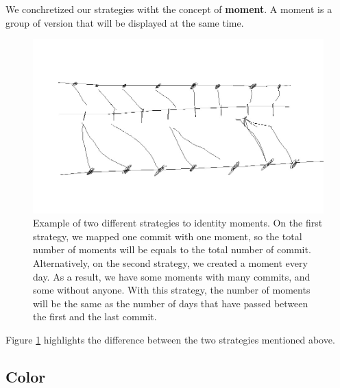 We conchretized our strategies witht the concept of \textbf{moment}. A moment is a group of version that will be displayed at the same time. 


\begin{figure}[H]
    \begin{center}
        \includegraphics[width=0.9\linewidth]{Moments.jpg} 
        \caption{Example of two different strategies to identity moments. 
        On the first strategy, we mapped one commit with one moment, so the total number of moments will be equals to the total number of commit.  
        Alternatively, on the second strategy, we created a moment every day.
        As a result, we have some moments with many commits, and some without anyone.
        With this strategy, the number of moments will be the same as the number of days that have passed between the first and the last commit. 
        }
        \label{fig:moment}
    \end{center}
\end{figure}

Figure \ref{fig:moment} highlights the difference between the two strategies mentioned above. 


\subsection*{Color}


